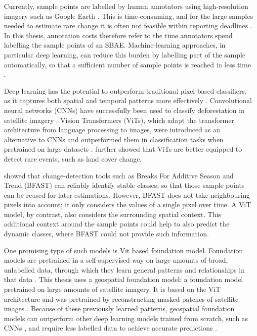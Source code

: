 \documentclass[11pt,a4paper]{report}
\begin{document}
Currently, sample points are labelled by human annotators using
high-resolution imagery such as Google Earth \parencite{olofsson2014}.
This is time-consuming, and for the large samples needed to estimate rare
change it is often not feasible within reporting deadlines
\parencite{jonckheere2024}. In this thesis, annotation costs therefore refer to the
time annotators spend labelling the sample points of an SBAE.
Machine-learning approaches, in particular deep learning, can reduce this
burden by labelling part of the sample automatically, so that a sufficient
number of sample points is reached in less time \parencite{jonckheere2024}.

Deep learning has the potential to outperform traditional pixel-based
classifiers, as it captures both spatial and temporal patterns more effectively
\parencite{masolele2021}. Convolutional neural networks (CNNs) have successfully
been used to classify deforestation in satellite imagery \parencite{pisl2024}.
Vision Transformers (ViTs), which adapt the transformer architecture from
language processing to images, were introduced as an alternative to CNNs and
outperformed them in classification tasks when pretrained on large datasets
\parencite{dosovitskiy2021}. \textcite{kaselimi2022} further showed that ViTs
are better equipped to detect rare events, such as land cover change. 

\textcite{tsendbazar2021} showed that change-detection tools such as Breaks For
Additive Season and Trend (BFAST) can reliably identify stable classes, so that
those sample points can be reused for later estimations. However, BFAST does not
take neighbouring pixels into account; it only considers the values of a single
pixel over time. A ViT model, by contrast, also considers the surrounding
spatial context. This additional context around the sample points could help to
also predict the dynamic classes, where BFAST could not provide such
information.

One promising type of such models is Vit based foundation model. Foundation models are
pretrained in a self-supervised way on large amounts of broad, unlabelled data,
through which they learn general patterns and relationships in that data
\parencite{szwarcman2025}. This thesis uses a geospatial foundation model: a
foundation model pretrained on large amounts of satellite imagery. It is based
on the ViT architecture and was pretrained by reconstructing masked patches of
satellite images \parencite{szwarcman2025}. Because of these previously learned
patterns, geospatial foundation models can outperform other deep learning models
trained from scratch, such as CNNs \parencite{szwarcman2025, simumba2025}, and
require less labelled data to achieve accurate predictions \parencite{szwarcman2025}.
\end{document}
